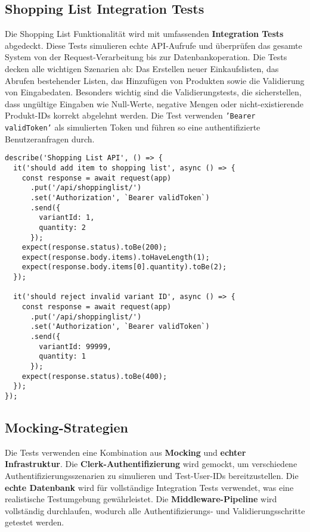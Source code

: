 \subsection{Shopping List Integration Tests}

Die Shopping List Funktionalität wird mit umfassenden \textbf{Integration Tests} abgedeckt. Diese Tests simulieren echte API-Aufrufe und überprüfen das gesamte System von der Request-Verarbeitung bis zur Datenbankoperation. Die Tests decken alle wichtigen Szenarien ab: Das Erstellen neuer Einkaufslisten, das Abrufen bestehender Listen, das Hinzufügen von Produkten sowie die Validierung von Eingabedaten. Besonders wichtig sind die Validierungstests, die sicherstellen, dass ungültige Eingaben wie Null-Werte, negative Mengen oder nicht-existierende Produkt-IDs korrekt abgelehnt werden. Die Test verwenden \texttt{'Bearer validToken'} als simulierten Token und führen so eine authentifizierte Benutzeranfragen durch.

\begin{lstlisting}[style=typescriptstyle,caption={Shopping List Integration Test}]
describe('Shopping List API', () => {
  it('should add item to shopping list', async () => {
    const response = await request(app)
      .put('/api/shoppinglist/')
      .set('Authorization', `Bearer validToken`)
      .send({
        variantId: 1,
        quantity: 2
      });
    expect(response.status).toBe(200);
    expect(response.body.items).toHaveLength(1);
    expect(response.body.items[0].quantity).toBe(2);
  });

  it('should reject invalid variant ID', async () => {
    const response = await request(app)
      .put('/api/shoppinglist/')
      .set('Authorization', `Bearer validToken`)
      .send({
        variantId: 99999,
        quantity: 1
      });
    expect(response.status).toBe(400);
  });
});
\end{lstlisting}

\subsection{Mocking-Strategien}

Die Tests verwenden eine Kombination aus \textbf{Mocking} und \textbf{echter Infrastruktur}. Die \textbf{Clerk-Authentifizierung} wird gemockt, um verschiedene Authentifizierungsszenarien zu simulieren und Test-User-IDs bereitzustellen. Die \textbf{echte Datenbank} wird für vollständige Integration Tests verwendet, was eine realistische Testumgebung gewährleistet. Die \textbf{Middleware-Pipeline} wird vollständig durchlaufen, wodurch alle Authentifizierungs- und Validierungsschritte getestet werden.

